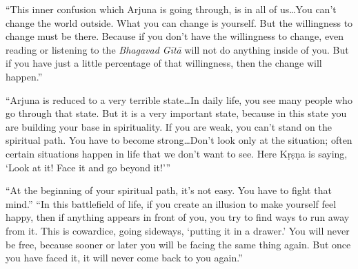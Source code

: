 \enquote{This inner confusion which Arjuna is going through, is in all of us\ldots You can’t change the world outside. What you can change is yourself. But the willingness to change must be there. Because if you don’t have the willingness to change, even reading or listening to the \textit{Bhagavad Gītā} will not do anything inside of you. But if you have just a little percentage of that willingness, then the change will happen.}

\enquote{Arjuna is reduced to a very terrible state\ldots In daily life, you see many people who go through that state. But it is a very important state, because in this state you are building your base in spirituality. If you are weak, you can’t stand on the spiritual path. You have to become strong\ldots Don’t look only at the situation; often certain situations happen in life that we don’t want to see. Here Kṛṣṇa is saying, \enquote{Look at it! Face it and go beyond it!}}

\enquote{At the beginning of your spiritual path, it’s not easy. You have to fight that mind.}
\enquote{In this battlefield of life, if you create an illusion to make yourself feel happy, then if anything appears in front of you, you try to find ways to run away from it. This is cowardice, going sideways, \enquote{putting it in a drawer.} You will never be free, because sooner or later you will be facing the same thing again. But once you have faced it, it will never come back to you again.}
